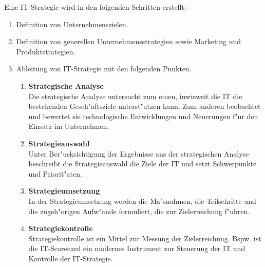 Eine IT-Strategie wird in den folgenden Schritten erstellt:
\begin{enumerate}

	\item Definition von Unternehmenszielen.
	
	\item Definition von generellen Unternehmensstrategien sowie Marketing und Produktstrategien.
	
	\item Ableitung von IT-Strategie mit den folgenden Punkten.\\
	
\begin{enumerate}

		\item \textbf{Strategische Analyse}\\
Die strategische Analyse untersucht zum einen, inwieweit die IT die bestehenden Gesch"aftsziele unterst"utzen kann. Zum anderen beobachtet und bewertet sie technologische Entwicklungen und Neuerungen f"ur den Einsatz im Unternehmen.
		
		\item \textbf{Strategieauswahl}\\
Unter Ber"ucksichtigung der Ergebnisse aus der strategischen Analyse beschreibt die Strategieauswahl die Ziele der IT und setzt Schwerpunkte und Priorit"aten.
		
		\item \textbf{Strategieumsetzung}\\
In der Strategieumsetzung werden die Ma"snahmen, die Teilschritte und die zugeh"origen Aufw"ande formuliert, die zur Zielerreichung f"uhren.

		\item \textbf{Strategiekontrolle}\\
Strategiekontrolle ist ein Mittel zur Messung der Zielerreichung. Bspw. ist die IT-Scorecard ein modernes Instrument zur Steuerung der IT und Kontrolle der IT-Strategie.

\end{enumerate}
	
\end{enumerate}
